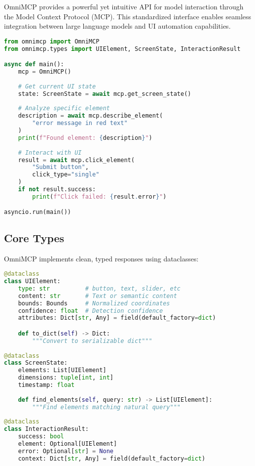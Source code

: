 \documentclass{article}
\begin{document}
OmniMCP provides a powerful yet intuitive API for model interaction through the Model Context Protocol (MCP). This standardized interface enables seamless integration between large language models and UI automation capabilities.

\begin{lstlisting}[language=Python]
from omnimcp import OmniMCP
from omnimcp.types import UIElement, ScreenState, InteractionResult

async def main():
    mcp = OmniMCP()
    
    # Get current UI state
    state: ScreenState = await mcp.get_screen_state()
    
    # Analyze specific element
    description = await mcp.describe_element(
        "error message in red text"
    )
    print(f"Found element: {description}")
    
    # Interact with UI
    result = await mcp.click_element(
        "Submit button",
        click_type="single"
    )
    if not result.success:
        print(f"Click failed: {result.error}")

asyncio.run(main())
\end{lstlisting}

\subsection{Core Types}

OmniMCP implements clean, typed responses using dataclasses:

\begin{lstlisting}[language=Python]
@dataclass
class UIElement:
    type: str          # button, text, slider, etc
    content: str       # Text or semantic content
    bounds: Bounds     # Normalized coordinates
    confidence: float  # Detection confidence
    attributes: Dict[str, Any] = field(default_factory=dict)

    def to_dict(self) -> Dict:
        """Convert to serializable dict"""
    
@dataclass
class ScreenState:
    elements: List[UIElement]
    dimensions: tuple[int, int]
    timestamp: float
    
    def find_elements(self, query: str) -> List[UIElement]:
        """Find elements matching natural query"""
    
@dataclass
class InteractionResult:
    success: bool
    element: Optional[UIElement]
    error: Optional[str] = None
    context: Dict[str, Any] = field(default_factory=dict)
\end{lstlisting}
\end{document}
